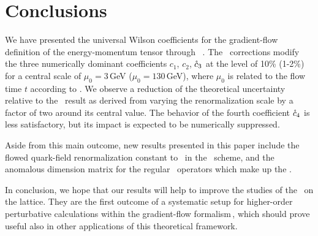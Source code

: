 \section{Conclusions}\label{sec:conclusions}

We have presented the universal Wilson coefficients for the
gradient-flow definition of the energy-momentum tensor through
\nnlo\ \qcd. The \nnlo\ corrections modify the three numerically
dominant coefficients $c_1$, $c_2$, $\mathring{c}_3$ at the level of 10\%
(1-2\%) for a central scale of $\mu_0=3$\,GeV ($\mu_0=130$\,GeV), where
$\mu_0$ is related to the flow time $t$ according to . We
observe a reduction of the theoretical uncertainty relative to the
\nlo\ result as derived from varying the renormalization scale by a
factor of two around its central value.  The behavior of the fourth
coefficient $\mathring{c}_4$ is less satisfactory, but its impact is expected
to be numerically suppressed.

Aside from this main outcome, new results presented in this paper
include the flowed quark-field renormalization constant to \nnlo\ in the
\msbar\ scheme, and the anomalous dimension matrix for the regular
\qcd\ operators which make up the \emt.

In conclusion, we hope that our results will help to improve the studies
of the \emt\ on the lattice. They are the first outcome of a systematic
setup for higher-order perturbative calculations within the
gradient-flow formalism\,\cite{Artz:2019bpr}, which should prove useful also
in other applications of this theoretical framework.

